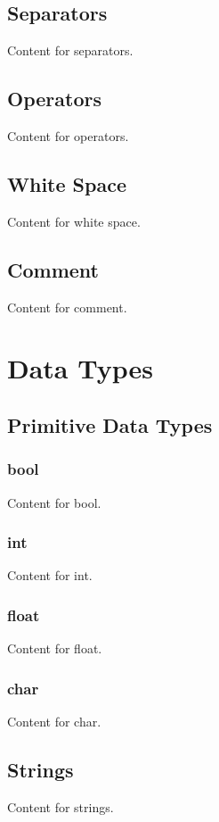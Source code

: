 \documentclass[11pt,A4]{article}
\begin{document}
        \subsection{Separators}
        Content for separators.
        
        \subsection{Operators}
        Content for operators.
        
        \subsection{White Space}
        Content for white space.
        
        \subsection{Comment}
        Content for comment.

    \newpage
    \section{Data Types}
        \subsection{Primitive Data Types}
            \subsubsection{bool}
            Content for bool.
            
            \subsubsection{int}
            Content for int.
            
            \subsubsection{float}
            Content for float.
            
            \subsubsection{char}
            Content for char.
            
        \subsection{Strings}
        Content for strings.
        
\end{document}
